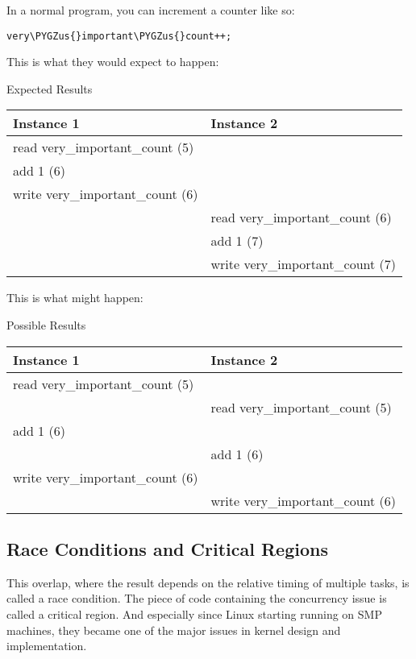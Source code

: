 \documentclass[a4paper,8pt,english]{sphinxmanual}
\def\PYGZus{\char`\_}
\begin{document}
In a normal program, you can increment a counter like so:

\begin{Verbatim}[commandchars=\\\{\}]
very\PYGZus{}important\PYGZus{}count++;
\end{Verbatim}

This is what they would expect to happen:


\begin{threeparttable}
\capstart\caption{Expected Results}\label{kernel-hacking/locking:id1}
\begin{tabulary}{\linewidth}{|L|L|}
\hline
\textsf{\relax 
Instance 1
} & \textsf{\relax 
Instance 2
}\\
\hline
read very\_important\_count (5)
 & \\
\hline
add 1 (6)
 & \\
\hline
write very\_important\_count (6)
 & \\
\hline & 
read very\_important\_count (6)
\\
\hline & 
add 1 (7)
\\
\hline & 
write very\_important\_count (7)
\\
\hline\end{tabulary}

\end{threeparttable}


This is what might happen:


\begin{threeparttable}
\capstart\caption{Possible Results}\label{kernel-hacking/locking:id2}
\begin{tabulary}{\linewidth}{|L|L|}
\hline
\textsf{\relax 
Instance 1
} & \textsf{\relax 
Instance 2
}\\
\hline
read very\_important\_count (5)
 & \\
\hline & 
read very\_important\_count (5)
\\
\hline
add 1 (6)
 & \\
\hline & 
add 1 (6)
\\
\hline
write very\_important\_count (6)
 & \\
\hline & 
write very\_important\_count (6)
\\
\hline\end{tabulary}

\end{threeparttable}



\subsection{Race Conditions and Critical Regions}
\label{kernel-hacking/locking:race-conditions-and-critical-regions}
This overlap, where the result depends on the relative timing of
multiple tasks, is called a race condition. The piece of code containing
the concurrency issue is called a critical region. And especially since
Linux starting running on SMP machines, they became one of the major
issues in kernel design and implementation.
\end{document}
